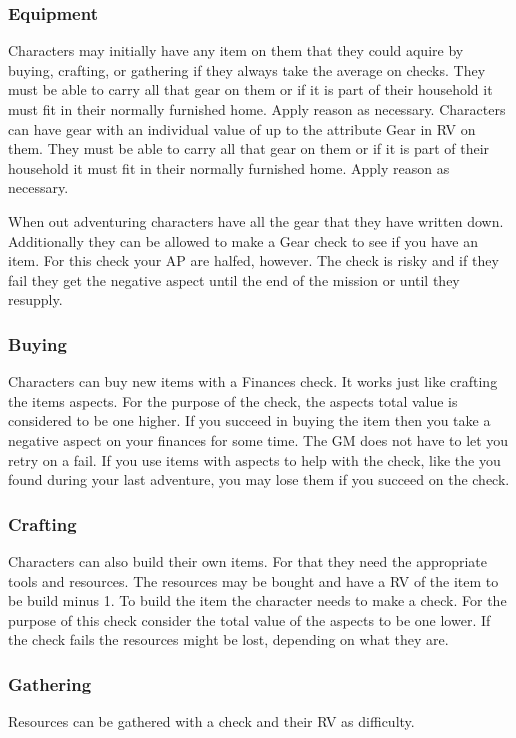 \documentclass[11pt]{article}
\begin{document}
{\subsubsection{Equipment}
\label{sec:org27a6665}
Characters may initially have any item on them that they could aquire by buying, crafting, or gathering if they always take the average on checks. They must be able to carry all that gear on them or if it is part of their household it must fit in their normally furnished home. Apply reason as necessary.
Characters can have gear with an individual value of up to the attribute Gear in RV on them. They must be able to carry all that gear on them or if it is part of their household it must fit in their normally furnished home. Apply reason as necessary.

When out adventuring characters have all the gear that they have written down. Additionally they can be allowed to make a Gear check to see if you have an item. For this check your AP are halfed, however. The check is risky and if they fail they get the negative aspect  until the end of the mission or until they resupply.
\subsubsection{Buying}
\label{sec:orgb1af3a2}
Characters can buy new items with a Finances check. It works just like crafting the items aspects. For the purpose of the check, the aspects total value is considered to be one higher. If you succeed in buying the item then you take a negative aspect  on your finances for some time. The GM does not have to let you retry on a fail. If you use items with aspects to help with the check, like the  you found during your last adventure, you may lose them if you succeed on the check.
\subsubsection{Crafting}
\label{sec:orgd627ee3}
Characters can also build their own items. For that they need the appropriate tools and resources. The resources may be bought and have a RV of the item to be build minus 1. To build the item the character needs to make a check. For the purpose of this check consider the total value of the aspects to be one lower. If the check fails the resources might be lost, depending on what they are.
\subsubsection{Gathering}
\label{sec:orga1c8173}
Resources can be gathered with a check and their RV as difficulty.
}
\end{document}
